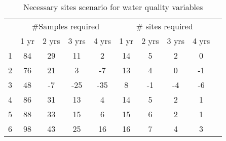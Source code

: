 \begin{table}[htbp]
\centering
\caption{Necessary sites scenario for water quality variables}
\begin{tabular}{ccccc|ccccc}
\toprule
\multicolumn{1}{c}{} &   \multicolumn{4}{c}{ \#Samples required} & \multicolumn{4}{c}{\# sites required} \\ \cline{2-9}\noalign{\smallskip}
\multicolumn{1}{p{3cm}}{Elevation Bands}  & 1 yr  & 2 yrs   & 3 yrs    & 4 yrs   & 1 yr   & 2 yrs  & 3 yrs  & 4 yrs\\ \midrule
1 &  84 & 29 & 11   & 2    & 14 & 5  & 2   & 0 \\ 
2  & 76 & 21 & 3     & -7   & 13 & 4  & 0   & -1 \\ 
3 &  48 & -7  & -25 & -35 & 8   & -1 & -4 & -6 \\
4 &  86 & 31 & 13  & 4     & 14 & 5  & 2  & 1 \\ 
5 &  88 & 33 & 15  & 6     & 15 & 6  & 2  & 1 \\ 
6 &  98 & 43 & 25  & 16   & 16 & 7  & 4  & 3 \\ \bottomrule
\end{tabular}
\label{tab:WQapsenario}
\end{table}